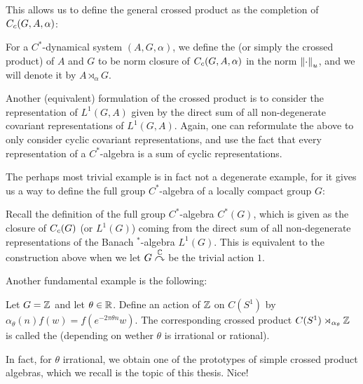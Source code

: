 This allows us to define the general crossed product as the completion of $C_c(G,A,\alpha)$:
\begin{definition}
For a $C^*$-dynamical system $(A,G,\alpha)$, we define the  (or simply the crossed product) of $A$ and $G$ to be norm closure of $C_c(G,A,\alpha)$ in the norm $\left\lVert \cdot \right\rVert_u$, and we will denote it by $A \rtimes_\alpha G$.
\end{definition}
\begin{remark}
Another (equivalent) formulation of the crossed product is to consider the representation of $L^1(G,A)$ given by the direct sum of all non-degenerate covariant representations of $L^1(G,A)$. Again, one can reformulate the above to only consider cyclic covariant representations, and use the fact that every representation of a $C^*$-algebra is a sum of cyclic representations.
\end{remark}
The perhaps most trivial example is in fact not a degenerate example, for it gives us a way to define the full group $C^*$-algebra of a locally compact group $G$:
\begin{example}
Recall the definition of the full group $C^*$-algebra $C^*(G)$, which is given as the closure of $C_c(G)$ (or $L^1(G)$) coming from the direct sum of all non-degenerate representations of the Banach $^*$-algebra $L^1(G)$. This is equivalent to the construction above when we let $G \stackrel{\mathbb{C}}{\curvearrowright}$ be the trivial action $1$. 
\end{example}
Another fundamental example is the following:
\begin{example}
Let $G = \mathbb{Z}$ and let $\theta \in \mathbb{R}$. Define an action of $\mathbb{Z}$ on $C(S^1)$ by $\alpha_\theta(n)f(w) = f(e^{-2\pi \theta n} w)$. The corresponding crossed product $C(S^1) \rtimes_{\alpha_\theta} \mathbb{Z}$ is called the  (depending on wether $\theta$ is irrational or rational).
\end{example}
In fact, for $\theta$ irrational, we obtain one of the prototypes of simple crossed product algebras, which we recall is the topic of this thesis. Nice!

